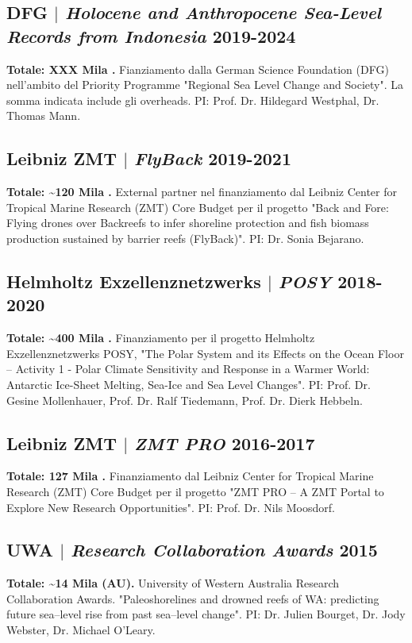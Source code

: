 \documentclass[11pt]{article}
\begin{document}
\bigskip

\subsection{DFG $|$ {\normalfont\textit{Holocene and Anthropocene Sea-Level Records from Indonesia}} \hfill 2019-2024}
{\footnotesize \textbf{Totale: XXX Mila \texteuro.} Fianziamento dalla German Science Foundation (DFG) nell'ambito del Priority Programme "Regional Sea Level Change and Society". La somma indicata include gli overheads. PI: Prof. Dr. Hildegard Westphal, Dr. Thomas Mann.}
\bigskip

\subsection{Leibniz ZMT $|$ {\normalfont\textit{FlyBack}} \hfill 2019-2021}
{\footnotesize \textbf{Totale: \textasciitilde120 Mila \texteuro.} External partner nel finanziamento dal Leibniz Center for Tropical Marine Research (ZMT) Core Budget per il progetto "Back and Fore: Flying drones over Backreefs to infer shoreline protection and fish biomass production sustained by barrier reefs (FlyBack)". PI: Dr. Sonia Bejarano.}
\bigskip

\subsection{Helmholtz Exzellenznetzwerks $|$ {\normalfont\textit{POSY}} \hfill 2018-2020}
{\footnotesize \textbf{Totale: \textasciitilde400 Mila \texteuro.} Finanziamento per il progetto Helmholtz Exzellenznetzwerks POSY, "The Polar System and its Effects on the Ocean Floor – Activity 1 - Polar Climate Sensitivity and Response in a Warmer World: Antarctic Ice-Sheet Melting, Sea-Ice and Sea Level Changes". PI: Prof. Dr. Gesine Mollenhauer, Prof. Dr. Ralf Tiedemann, Prof. Dr. Dierk Hebbeln.}
\bigskip

\subsection{Leibniz ZMT $|$ {\normalfont\textit{ZMT PRO}} \hfill 2016-2017}
{\footnotesize \textbf{Totale: 127 Mila \texteuro.} Finanziamento dal Leibniz Center for Tropical Marine Research (ZMT) Core Budget per il progetto "ZMT PRO – A ZMT Portal to Explore New Research Opportunities". PI: Prof. Dr. Nils Moosdorf.}

\bigskip
\subsection{UWA $|$ {\normalfont\textit{Research Collaboration Awards}} \hfill 2015}
{\footnotesize \textbf{Totale: \textasciitilde14 Mila \textdollar (AU).}  University of Western Australia Research Collaboration Awards. "Paleoshorelines and drowned reefs of WA: predicting future sea–level rise from past sea–level change". PI: Dr. Julien Bourget, Dr. Jody Webster, Dr. Michael O'Leary.}
\end{document}
